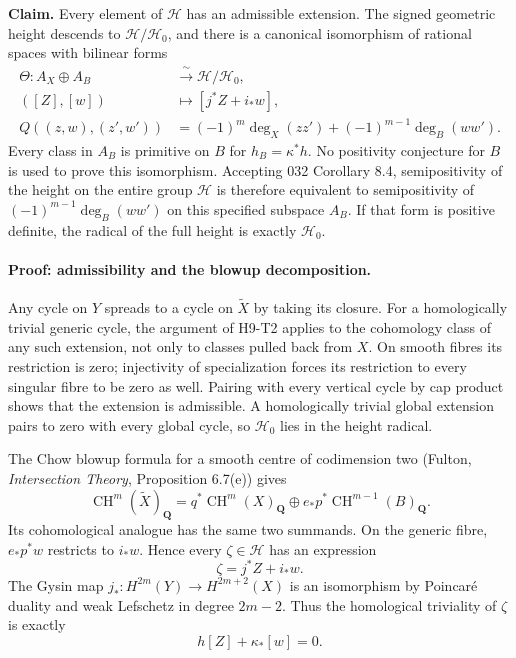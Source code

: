 \textbf{Claim.} Every element of $\mathcal H$ has an admissible extension.
The signed geometric height descends to $\mathcal H/\mathcal H_0$, and
there is a canonical isomorphism of rational spaces with bilinear forms
\[
 \begin{split}
 \Theta:A_X\oplus A_B&\xrightarrow{\ \sim\ }
                          \mathcal H/\mathcal H_0,\\
 ([Z],[w])&\longmapsto[j^*Z+i_*w],\\
 Q((z,w),(z',w'))&=(-1)^m\deg_X(zz')
                    +(-1)^{m-1}\deg_B(ww').
 \end{split}                                                   \tag{H9.18}
\]
Every class in $A_B$ is primitive on $B$ for $h_B=\kappa^*h$.
No positivity conjecture for $B$ is used to prove this isomorphism.
Accepting 032 Corollary 8.4, semipositivity of the height on the entire
group $\mathcal H$ is therefore equivalent to semipositivity of
$(-1)^{m-1}\deg_B(ww')$ on this specified subspace $A_B$.
If that form is positive definite, the radical of the full height is
exactly $\mathcal H_0$.

\paragraph{Proof: admissibility and the blowup decomposition.}
Any cycle on $Y$ spreads to a cycle on $\widetilde X$ by taking its closure.
For a homologically trivial generic cycle, the argument of H9-T2 applies
to the cohomology class of any such extension, not only to classes pulled
back from $X$. On smooth fibres its restriction is zero; injectivity of
specialization forces its restriction to every singular fibre to be zero
as well. Pairing with every vertical cycle by cap product shows that the
extension is admissible. A homologically trivial global extension pairs
to zero with every global cycle, so $\mathcal H_0$ lies in the height
radical.

The Chow blowup formula for a smooth centre of codimension two
(Fulton, \emph{Intersection Theory}, Proposition 6.7(e)) gives
\[
 \operatorname{CH}^m(\widetilde X)_{\mathbf Q}
   =q^*\operatorname{CH}^m(X)_{\mathbf Q}
      \oplus e_*p^*\operatorname{CH}^{m-1}(B)_{\mathbf Q}.        \tag{H9.19}
\]
Its cohomological analogue has the same two summands. On the generic
fibre, $e_*p^*w$ restricts to $i_*w$. Hence every $\zeta\in\mathcal H$
has an expression
\[
 \zeta=j^*Z+i_*w.
\]
The Gysin map $j_*:H^{2m}(Y)\to H^{2m+2}(X)$ is an isomorphism by
Poincar\'e duality and weak Lefschetz in degree $2m-2$. Thus the
homological triviality of $\zeta$ is exactly
\[
 h[Z]+\kappa_*[w]=0.                                           \tag{H9.20}
\]

